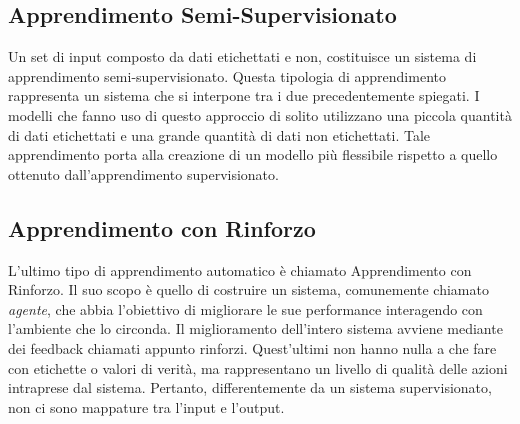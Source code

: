 \subsection{Apprendimento Semi-Supervisionato}
Un set di input composto da dati etichettati e non, costituisce un sistema di apprendimento 
semi-supervisionato. Questa tipologia di apprendimento rappresenta 
un sistema che si interpone tra i due precedentemente spiegati. I modelli che fanno 
uso di questo approccio di solito utilizzano una piccola quantità di dati etichettati 
e una grande quantità di dati non etichettati. Tale apprendimento porta alla 
creazione di un modello più flessibile rispetto a quello ottenuto dall’apprendimento 
supervisionato.

\subsection{Apprendimento con Rinforzo}
L’ultimo tipo di apprendimento automatico è chiamato Apprendimento con 
Rinforzo. Il suo scopo è quello di costruire un sistema, comunemente chiamato 
\emph{agente}, che abbia l’obiettivo di migliorare le sue performance interagendo con 
l’ambiente che lo circonda. Il miglioramento dell’intero sistema avviene mediante 
dei feedback chiamati appunto rinforzi. Quest’ultimi non hanno nulla a che fare 
con etichette o valori di verità, ma rappresentano un livello di qualità delle azioni 
intraprese dal sistema. Pertanto, differentemente da un sistema supervisionato, 
non ci sono mappature tra l’input e l’output.

